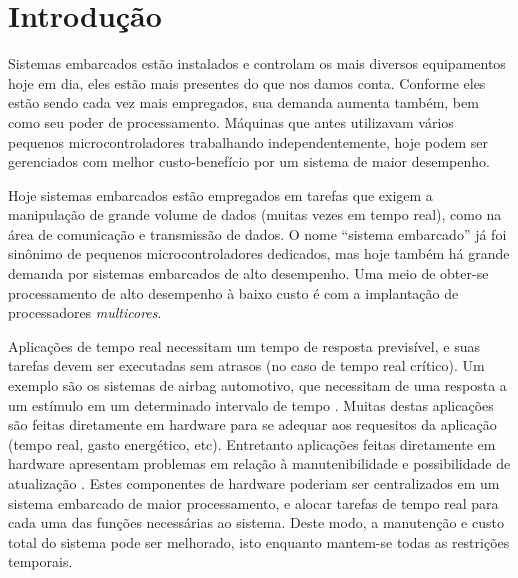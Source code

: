 \chapter{Introdução}


Sistemas embarcados estão instalados e controlam os mais diversos equipamentos hoje em dia, eles estão mais presentes do que nos damos conta. Conforme eles estão sendo cada vez mais empregados, sua demanda aumenta também, bem como seu poder de processamento. Máquinas que antes utilizavam vários pequenos microcontroladores trabalhando independentemente, hoje podem ser gerenciados com melhor custo-benefício por um sistema de maior desempenho.%


Hoje sistemas embarcados estão empregados em tarefas que exigem a manipulação de grande volume de dados (muitas vezes em tempo real), como na área de comunicação e transmissão de dados. O nome ``sistema embarcado'' já foi sinônimo de pequenos microcontroladores dedicados, mas hoje também há grande demanda por sistemas embarcados de alto desempenho. Uma meio de obter-se processamento de alto desempenho à baixo custo é com a implantação de processadores \emph{multicores}.

Aplicações de tempo real necessitam um tempo de resposta previsível, e suas tarefas devem ser executadas sem atrasos (no caso de tempo real crítico). Um exemplo são os sistemas de airbag automotivo, que necessitam de uma resposta a um estímulo em um determinado intervalo de tempo \cite{nat}. Muitas destas aplicações são feitas diretamente em hardware para se adequar aos requesitos da aplicação (tempo real, gasto energético, etc). Entretanto aplicações feitas diretamente em hardware apresentam problemas em relação à manutenibilidade e possibilidade de atualização \cite{gio}. Estes componentes de hardware poderiam ser centralizados em um sistema embarcado de maior processamento, e alocar tarefas de tempo real para cada uma das funções necessárias ao sistema. Deste modo, a manutenção e custo total do sistema pode ser melhorado, isto enquanto mantem-se todas as restrições temporais.

